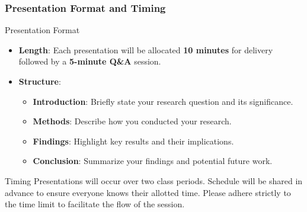 \documentclass[aspectratio=169]{beamer}
\begin{document}
\begin{frame}[fragile]
  \frametitle{Presentation Format and Timing}
  \begin{block}{Presentation Format}
    \begin{itemize}
      \item \textbf{Length}: Each presentation will be allocated \textbf{10 minutes} for delivery followed by a \textbf{5-minute Q\&A} session.
      \item \textbf{Structure}:
        \begin{itemize}
          \item \textbf{Introduction}: Briefly state your research question and its significance.
          \item \textbf{Methods}: Describe how you conducted your research.
          \item \textbf{Findings}: Highlight key results and their implications.
          \item \textbf{Conclusion}: Summarize your findings and potential future work.
        \end{itemize}
    \end{itemize}
  \end{block}
  
  \begin{block}{Timing}
    Presentations will occur over two class periods. Schedule will be shared in advance to ensure everyone knows their allotted time.
    Please adhere strictly to the time limit to facilitate the flow of the session.
  \end{block}
\end{frame}
\end{document}
